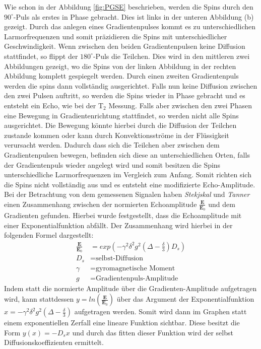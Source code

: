 Wie schon in der Abbildung \ref{fig:PGSE} beschrieben, werden die Spins durch den $90^{\circ}$-Puls als erstes in Phase gebracht. Dies ist links in der unteren Abbildung (b) gezeigt. Durch das anlegen eines Gradientenpulses kommt es zu unterschiedlichen Larmorfrequenzen und somit präzidieren die Spins mit unterschiedlicher Geschwindigkeit.
Wenn zwischen den beiden Gradientenpulsen keine Diffusion stattfindet, so flippt der $180^{\circ}$-Puls die Teilchen. Dies wird in den mittleren zwei Abbildungen gezeigt, wo die Spins von der linken Abbildung in der rechten Abbildung komplett gespiegelt werden. Durch einen zweiten Gradientenpuls werden die spins dann vollständig ausgerichtet. Falls nun keine Diffusion zwischen den zwei Pulsen auftritt, so werden die Spins wieder in Phase gebracht und es entsteht ein Echo,
 wie bei der T$_2$ Messung.
Falls aber zwischen den zwei Phasen eine Bewegung in Gradientenrichtung stattfindet,
so werden nicht alle Spins ausgerichtet. 
Die Bewegung könnte hierbei durch die Diffusion der Teilchen zustande kommen oder kann durch Konvektionsströme in der Flüssigkeit verursacht werden.
Dadurch dass sich die Teilchen aber zwischen dem Gradientenpulsen bewegen, befinden sich diese an unterschiedlichen Orten, falls der Gradientenpuls wieder angelegt wird und somit besitzen die Spins unterschiedliche Larmorfrequenzen im Vergleich zum Anfang.
Somit richten sich die Spins nicht vollständig aus und es entsteht eine modifizierte Echo-Amplitude.
Bei der Betrachtung von dem gemessenen Signalen haben \textit{Stekjskal} und \textit{Tanner} einen Zusammenhang zwischen der normierten Echoamplitude $\frac{\textbf{E}}{\textbf{E}_0}$ und dem Gradienten gefunden. Hierbei wurde festgestellt, dass die Echoamplitude mit einer Exponentialfunktion abfällt. Der Zusammenhang wird hierbei in der folgenden Formel dargestellt:
\begin{align}
    \frac{\textbf{E}}{\textbf{E}_0}&=exp\left(-\gamma^2\delta^2g^2\left(\Delta-\frac{\delta}{3}\right)D_s\right)\\
    D_s&=\text{selbst-Diffusion}\\
    \gamma&= \text{gyromagnetische Moment}\\
    g &= \text{Gradientenpuls-Amplitude}
\end{align}
Indem statt die normierte Amplitude über die Gradienten-Amplitude aufgetragen wird, kann stattdessen $y=ln\left(\frac{\textbf{E}}{\textbf{E}_0}\right)$ über  das Argument der Exponentialfunktion\\
 $x= -\gamma^2\delta^2g^2\left(\Delta-\frac{\delta}{3}\right)$ aufgetragen werden. Somit wird dann im Graphen statt einem exponentiellen Zerfall eine lineare Funktion sichtbar. Diese besitzt die Form $y(x)=-D_sx$ und durch das fitten dieser Funktion wird der selbst Diffusionskoeffizienten ermittelt.       

